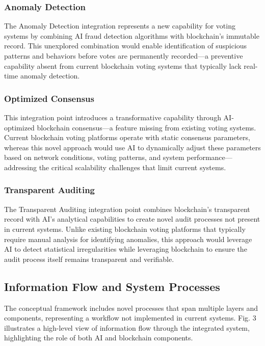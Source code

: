 \documentclass[conference]{IEEEtran}
\begin{document}
\subsubsection{Anomaly Detection}
The Anomaly Detection integration represents a new capability for voting systems by combining AI fraud detection algorithms with blockchain's immutable record. This unexplored combination would enable identification of suspicious patterns and behaviors before votes are permanently recorded—a preventive capability absent from current blockchain voting systems that typically lack real-time anomaly detection.

\subsubsection{Optimized Consensus}
This integration point introduces a transformative capability through AI-optimized blockchain consensus—a feature missing from existing voting systems. Current blockchain voting platforms operate with static consensus parameters, whereas this novel approach would use AI to dynamically adjust these parameters based on network conditions, voting patterns, and system performance—addressing the critical scalability challenges that limit current systems.

\subsubsection{Transparent Auditing}
The Transparent Auditing integration point combines blockchain's transparent record with AI's analytical capabilities to create novel audit processes not present in current systems. Unlike existing blockchain voting platforms that typically require manual analysis for identifying anomalies, this approach would leverage AI to detect statistical irregularities while leveraging blockchain to ensure the audit process itself remains transparent and verifiable.

\subsection{Information Flow and System Processes}
The conceptual framework includes novel processes that span multiple layers and components, representing a workflow not implemented in current systems. Fig. 3 illustrates a high-level view of information flow through the integrated system, highlighting the role of both AI and blockchain components.
\end{document}
